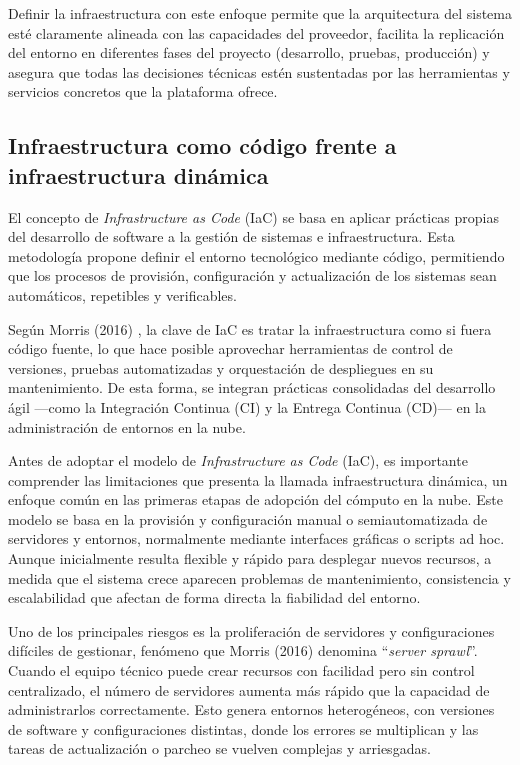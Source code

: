 Definir la infraestructura con este enfoque permite que la arquitectura del sistema esté claramente alineada con las capacidades del proveedor, facilita la replicación del entorno en diferentes fases del proyecto (desarrollo, pruebas, producción) y asegura que todas las decisiones técnicas estén sustentadas por las herramientas y servicios concretos que la plataforma ofrece.

\subsection*{Infraestructura como código frente a infraestructura dinámica}

El concepto de \textit{Infrastructure as Code} (IaC) se basa en aplicar prácticas propias del desarrollo de software a la gestión de sistemas e infraestructura. Esta metodología propone definir el entorno tecnológico mediante código, permitiendo que los procesos de provisión, configuración y actualización de los sistemas sean automáticos, repetibles y verificables.

Según Morris (2016) \cite{Morris2016}, la clave de IaC es tratar la infraestructura como si fuera código fuente, lo que hace posible aprovechar herramientas de control de versiones, pruebas automatizadas y orquestación de despliegues en su mantenimiento. De esta forma, se integran prácticas consolidadas del desarrollo ágil —como la Integración Continua (CI) y la Entrega Continua (CD)— en la administración de entornos en la nube.

Antes de adoptar el modelo de \textit{Infrastructure as Code} (IaC), es importante comprender las limitaciones que presenta la llamada infraestructura dinámica, un enfoque común en las primeras etapas de adopción del cómputo en la nube. Este modelo se basa en la provisión y configuración manual o semiautomatizada de servidores y entornos, normalmente mediante interfaces gráficas o scripts ad hoc. Aunque inicialmente resulta flexible y rápido para desplegar nuevos recursos, a medida que el sistema crece aparecen problemas de mantenimiento, consistencia y escalabilidad que afectan de forma directa la fiabilidad del entorno.

Uno de los principales riesgos es la proliferación de servidores y configuraciones difíciles de gestionar, fenómeno que Morris (2016) \cite{Morris2016} denomina “\textit{server sprawl}”. Cuando el equipo técnico puede crear recursos con facilidad pero sin control centralizado, el número de servidores aumenta más rápido que la capacidad de administrarlos correctamente. Esto genera entornos heterogéneos, con versiones de software y configuraciones distintas, donde los errores se multiplican y las tareas de actualización o parcheo se vuelven complejas y arriesgadas.

